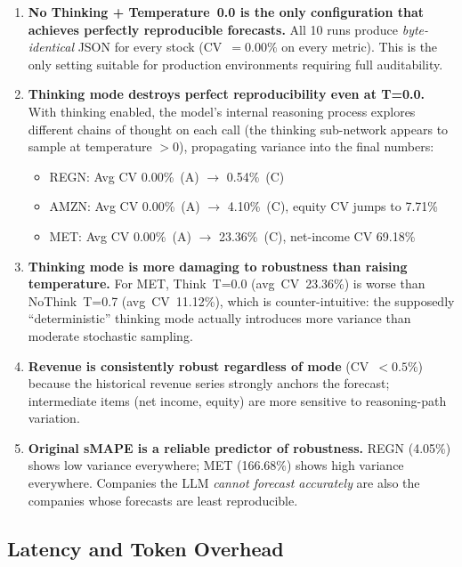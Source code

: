 \documentclass[11pt,a4paper]{article}
\begin{document}
\begin{enumerate}
  \item \textbf{No Thinking + Temperature~0.0 is the only configuration that
        achieves perfectly reproducible forecasts.}
        All 10 runs produce \emph{byte-identical} JSON for every stock
        (CV~$= 0.00\%$ on every metric).  This is the only setting suitable
        for production environments requiring full auditability.

  \item \textbf{Thinking mode destroys perfect reproducibility even at T=0.0.}
        With thinking enabled, the model's internal reasoning process explores
        different chains of thought on each call (the thinking sub-network
        appears to sample at temperature $> 0$), propagating variance into the
        final numbers:
        \begin{itemize}
          \item REGN: Avg CV 0.00\%~(A) $\to$ 0.54\%~(C)
          \item AMZN: Avg CV 0.00\%~(A) $\to$ 4.10\%~(C), equity CV jumps to 7.71\%
          \item MET:  Avg CV 0.00\%~(A) $\to$ 23.36\%~(C), net-income CV 69.18\%
        \end{itemize}

  \item \textbf{Thinking mode is more damaging to robustness than raising temperature.}
        For MET, Think~T=0.0 (avg~CV~23.36\%) is worse than NoThink~T=0.7
        (avg~CV~11.12\%), which is counter-intuitive: the supposedly
        ``deterministic'' thinking mode actually introduces more variance than
        moderate stochastic sampling.

  \item \textbf{Revenue is consistently robust regardless of mode} (CV~$< 0.5\%$)
        because the historical revenue series strongly anchors the forecast;
        intermediate items (net income, equity) are more sensitive to reasoning-path
        variation.

  \item \textbf{Original sMAPE is a reliable predictor of robustness.}
        REGN (4.05\%) shows low variance everywhere; MET (166.68\%) shows high
        variance everywhere.  Companies the LLM \emph{cannot forecast accurately}
        are also the companies whose forecasts are least reproducible.
\end{enumerate}

\subsection{Latency and Token Overhead}
\end{document}
